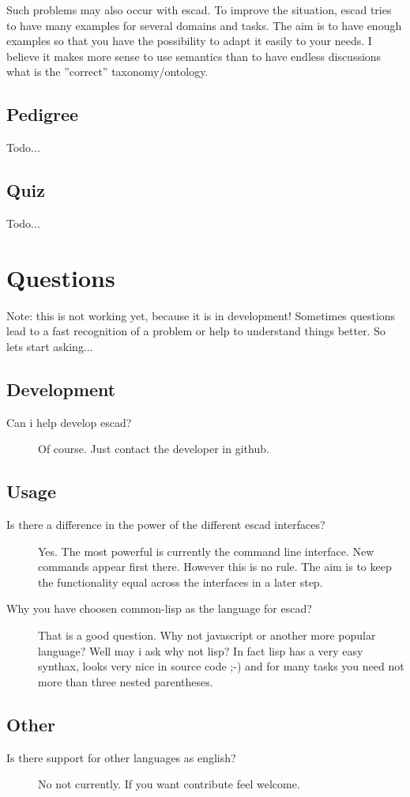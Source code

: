 \documentclass[a4paper, 12pt, openany]{scrbook}
\begin{document}
Such problems may also occur with escad. To improve the situation, escad tries to have many examples for several domains and tasks. The aim is to have enough examples so that you have the possibility to adapt it easily to your needs. I believe it makes more sense to use semantics than to have endless discussions what is the ''correct'' taxonomy/ontology.
\subsection{Pedigree}
Todo...
\subsection{Quiz}
Todo...
\section{Questions}
Note: this is not working yet, because it is in development!
Sometimes questions lead to a fast recognition of a problem or help to understand things better. So lets start asking...
\subsection{Development}
\begin{description}
\item[Can i help develop escad?] Of course. Just contact the developer in github.
\end{description}
\subsection{Usage}
\begin{description}
\item[Is there a difference in the power of the different escad interfaces?] Yes. The most powerful is currently the command line interface. New commands appear first there. However this is no rule. The aim is to keep the functionality equal across the interfaces in a later step.
\item[Why you have choosen common-lisp as the language for escad?] That is a good question. Why not javascript or another more popular language? Well may i ask why not lisp? In fact lisp has a very easy synthax, looks very nice in source code ;-) and for many tasks you need not more than three nested parentheses.
\end{description}
\subsection{Other}
\begin{description}
\item[Is there support for other languages as english?]  No not currently. If you want contribute feel welcome.
\end{description}
\end{document}
